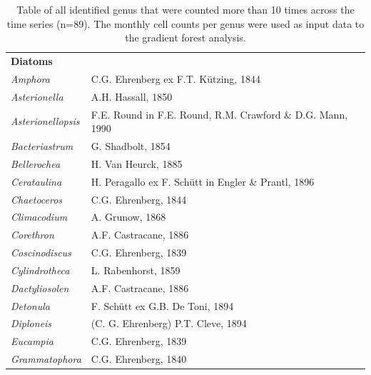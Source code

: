 \documentclass[draft]{agujournal2019}
\begin{document}
%
\begin{table}
\caption{Table of all identified genus that were counted more than 10 times across the time series (n=89). The monthly cell counts per genus were used as input data to the gradient forest analysis.}

\begin{tabular}{@{}ll@{}}
\textbf{Diatoms} &                                                            \\
\textit{Amphora}           & C.G. Ehrenberg ex F.T. Kützing, 1844                       \\
\textit{Asterionella}      & A.H. Hassall, 1850                                         \\
\textit{Asterionellopsis}  & F.E. Round in F.E. Round, R.M. Crawford \& D.G. Mann, 1990 \\
\textit{Bacteriastrum}     & G. Shadbolt, 1854                                          \\
\textit{Bellerochea}       & H. Van Heurck, 1885                                        \\
\textit{Cerataulina}       & H. Peragallo ex F. Schütt in Engler \& Prantl, 1896        \\
\textit{Chaetoceros}       & C.G. Ehrenberg, 1844                                       \\
\textit{Climacodium}       & A. Grunow, 1868                                            \\
\textit{Corethron}         & A.F. Castracane, 1886                                      \\
\textit{Coscinodiscus}     & C.G. Ehrenberg, 1839                                       \\
\textit{Cylindrotheca}     & L. Rabenhorst, 1859                                        \\
\textit{Dactyliosolen}     & A.F. Castracane, 1886                                      \\
\textit{Detonula}          & F. Schütt ex G.B. De Toni, 1894                            \\
\textit{Diploneis}         & (C. G. Ehrenberg) P.T. Cleve, 1894                         \\
\textit{Eucampia}          & C.G. Ehrenberg, 1839                                       \\
\textit{Grammatophora}     & C.G. Ehrenberg, 1840                                       \\

\end{tabular}
\end{table}
\end{document}
